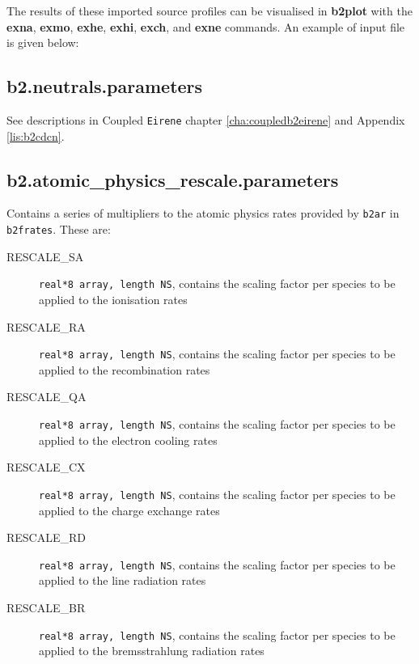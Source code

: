 \documentclass[a4paper,10pt]{report}
\newcommand{\btwoplot}{{\bf b2plot} }
\begin{document}
The results of these imported source profiles can be visualised in
\btwoplot with the {\bf exna}, {\bf exmo}, {\bf exhe}, {\bf exhi},
{\bf exch}, and {\bf exne} commands. An example of input file is given below:


\subsection{b2.neutrals.parameters}
\label{lab:b2:neutrals:parameters}

See descriptions in Coupled {\tt Eirene} chapter \ref{cha:coupledb2eirene}
and Appendix \ref{lis:b2cdcn}.

\subsection{b2.atomic\_physics\_rescale.parameters}
\label{lab:b2:atomic_physics_rescale:parameters}

Contains a series of multipliers to the atomic physics rates provided by {\tt b2ar} in {\tt b2frates}.
These are:
\begin{description}
  \item[RESCALE\_SA] {\tt real*8 array, length NS},
  contains the scaling factor per species to be applied to the ionisation rates
  \item[RESCALE\_RA] {\tt real*8 array, length NS},
  contains the scaling factor per species to be applied to the recombination rates
  \item[RESCALE\_QA] {\tt real*8 array, length NS},
  contains the scaling factor per species to be applied to the electron cooling rates
  \item[RESCALE\_CX] {\tt real*8 array, length NS},
  contains the scaling factor per species to be applied to the charge exchange rates
  \item[RESCALE\_RD] {\tt real*8 array, length NS},
  contains the scaling factor per species to be applied to the line radiation rates
  \item[RESCALE\_BR] {\tt real*8 array, length NS},
  contains the scaling factor per species to be applied to the bremsstrahlung radiation rates
\end{description}
\end{document}
